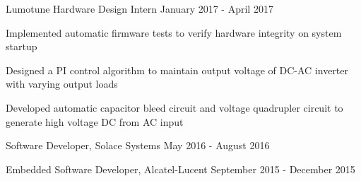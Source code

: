 \begin{cventries}
  \cventry
    {Lumotune} %
    {Hardware Design Intern} %
    {January 2017 - April 2017} %
    {}
    {
      \begin{cvitems} %
        \item {Implemented automatic firmware tests to verify hardware integrity on system startup}
        \item {Designed a PI control algorithm to maintain output voltage of DC-AC inverter with varying output loads}
        \item {Developed automatic capacitor bleed circuit and voltage quadrupler circuit to generate high voltage DC from AC input}
      \end{cvitems}
    }

  \cventryOneLine
    {Software Developer,} %
    {Solace Systems} %
    {May 2016 - August 2016} %

  \cventryOneLine
    {Embedded Software Developer,} %
    {Alcatel-Lucent} %
    {September 2015 - December 2015} %


\end{cventries}

